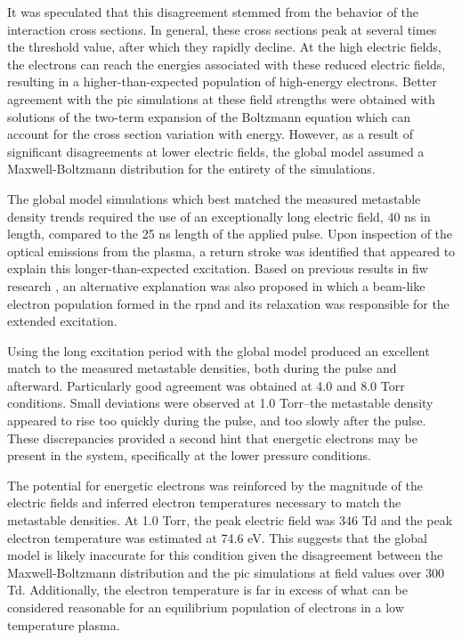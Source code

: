 It was speculated that this disagreement stemmed from the behavior of the
interaction cross sections. In general, these cross sections peak at several
times the threshold value, after which they rapidly decline. At the high
electric fields, the electrons can reach the energies associated with these
reduced electric fields, resulting in a higher-than-expected population of
high-energy electrons. Better agreement with the \acs{pic} simulations at these
field strengths were obtained with solutions of the two-term expansion of the
Boltzmann equation which can account for the cross section variation with
energy. However, as a result of significant disagreements at lower electric
fields, the global model assumed a Maxwell-Boltzmann distribution for the
entirety of the simulations.

The global model simulations which best matched the measured metastable density
trends required the use of an exceptionally long electric field, 40 ns in
length, compared to the 25 ns length of the applied pulse. Upon inspection of
the optical emissions from the plasma, a return stroke was identified that
appeared to explain this longer-than-expected excitation. Based on previous
results in \acs{fiw} research \cite{Starikovskaia1998}, an alternative
explanation was also proposed in which a beam-like electron population formed in
the \acs{rpnd} and its relaxation was responsible for the extended excitation.

Using the long excitation period with the global model produced an excellent
match to the measured metastable densities, both during the pulse and afterward.
Particularly good agreement was obtained at 4.0 and 8.0 Torr conditions. Small
deviations were observed at 1.0 Torr--the metastable density appeared to rise
too quickly during the pulse, and too slowly after the pulse. These
discrepancies provided a second hint that energetic electrons may be present in
the system, specifically at the lower pressure conditions.

The potential for energetic electrons was reinforced by the magnitude of the
electric fields and inferred electron temperatures necessary to match the
metastable densities. At 1.0 Torr, the peak electric field was 346 Td and the
peak electron temperature was estimated at 74.6 eV. This suggests that the
global model is likely inaccurate for this condition given the disagreement
between the Maxwell-Boltzmann distribution and the \acs{pic} simulations at
field values over 300 Td. Additionally, the electron temperature is far in
excess of what can be considered reasonable for an equilibrium population of
electrons in a low temperature plasma.

